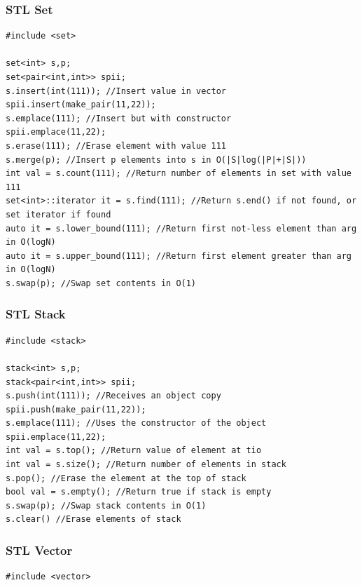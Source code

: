 \documentclass[twoside]{article}
\begin{document}
\begin{multicols*}{2}
\begin{verbatim}
\end{verbatim}

\subsubsectionfont{\large\bfseries\sffamily\underline}
\subsubsection*{STL Set}
\begin{verbatim}
#include <set>

set<int> s,p;
set<pair<int,int>> spii;
s.insert(int(111)); //Insert value in vector
spii.insert(make_pair(11,22));
s.emplace(111); //Insert but with constructor
spii.emplace(11,22);
s.erase(111); //Erase element with value 111
s.merge(p); //Insert p elements into s in O(|S|log(|P|+|S|))
int val = s.count(111); //Return number of elements in set with value 111
set<int>::iterator it = s.find(111); //Return s.end() if not found, or set iterator if found
auto it = s.lower_bound(111); //Return first not-less element than arg in O(logN)
auto it = s.upper_bound(111); //Return first element greater than arg in O(logN)
s.swap(p); //Swap set contents in O(1)

\end{verbatim}

\subsubsectionfont{\large\bfseries\sffamily\underline}
\subsubsection*{STL Stack}
\begin{verbatim}
#include <stack>

stack<int> s,p;
stack<pair<int,int>> spii;
s.push(int(111)); //Receives an object copy
spii.push(make_pair(11,22));
s.emplace(111); //Uses the constructor of the object
spii.emplace(11,22);
int val = s.top(); //Return value of element at tio
int val = s.size(); //Return number of elements in stack
s.pop(); //Erase the element at the top of stack
bool val = s.empty(); //Return true if stack is empty
s.swap(p); //Swap stack contents in O(1)
s.clear() //Erase elements of stack

\end{verbatim}

\subsubsectionfont{\large\bfseries\sffamily\underline}
\subsubsection*{STL Vector}
\begin{verbatim}
#include <vector>


\end{verbatim}
\end{multicols*}
\end{document}
